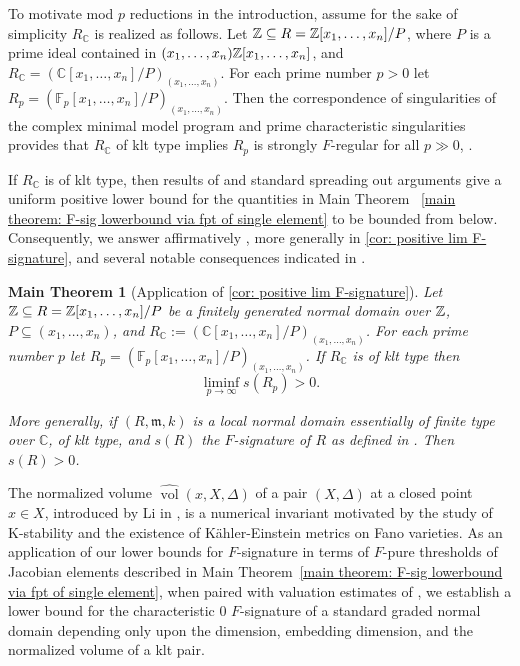 \documentclass[12pt]{amsart}
\numberwithin{equation}{theorem}
\theoremstyle{plain}
\newtheorem{maintheorem}{Main Theorem}
\DeclareMathOperator{\vol}{vol}
\newcommand{\fm}{\mathfrak{m}}
\newcommand{\CC}{\mathbb{C}}
\newcommand{\FF}{\mathbb{F}}
\begin{document}
To motivate mod $p$ reductions in the introduction, assume for the sake of simplicity $R_{\CC}$ is realized as follows. Let $\mbox{$\mathbb{Z}$}\subseteq R = \mbox{$\mathbb{Z}$}[x_1,\ldots,x_n]/P$, where $P$ is a prime ideal contained in $(x_1,\ldots,x_n)\mbox{$\mathbb{Z}$}[x_1,\ldots,x_n]$, and $R_{\CC} = \left(\CC[x_1,\ldots,x_n]/P\right)_{(x_1,\ldots,x_n)}$. For each prime number $p>0$ let $R_p = \left(\FF_p[x_1,\ldots,x_n]/P\right)_{(x_1,\ldots,x_n)}$. Then the correspondence of singularities of the complex minimal model program and prime characteristic singularities provides that $R_{\CC}$ of klt type implies $R_p$ is strongly $F$-regular for all $p\gg 0$, \cite{HaraWatanabe2002, Takagi2004}.

If $R_{\CC}$ is of klt type, then results of \cite{MTW05, CEMS18,TY26,Takagi2004} and standard spreading out arguments give a uniform positive lower bound for the quantities in Main Theorem ~\ref{main theorem: F-sig lowerbound via fpt of single element} to be bounded from below. Consequently, we answer affirmatively \cite[Question~5.9]{CarvajalRojasSchwedeTucker2018}, more generally \cite[Conjecture A]{TY26} in \cref{cor: positive lim F-signature}, and several notable consequences indicated in \cite[Section~5]{CarvajalRojasSchwedeTucker2018}.

\begin{maintheorem}[Application of \cref{cor: positive lim F-signature}]
    \label{main thm: positive F-signature for klt type singularity}
    Let $\mbox{$\mathbb{Z}$}\subseteq R = \mbox{$\mathbb{Z}$}[x_1,\ldots,x_n]/P$ be a finitely generated normal domain over $\mbox{$\mathbb{Z}$}$, $P\subseteq (x_1,\ldots,x_n)$, and $R_{\CC}:= (\CC[x_1,\ldots,x_n]/P)_{(x_1,\ldots,x_n)}$. For each prime number $p$ let $R_p = (\FF_p[x_1,\ldots,x_n]/P)_{(x_1,\ldots,x_n)}$. If $R_{\CC}$ is of klt type then
    \[
    \liminf_{p\to\infty}s(R_p)>0.
    \]

    More generally, if $(R,\fm,k)$ is a local normal domain essentially of finite type over $\CC$, of klt type, and $s(R)$ the $F$-signature of $R$ as defined in \cite[Definition~4.1]{TY26}. Then $s(R)>0$.
\end{maintheorem}

The normalized volume $\widehat{\vol}(x,X,\Delta)$ of a pair $(X,\Delta)$ at a closed point $x\in X$, introduced by Li in \cite{Li18}, is a numerical invariant motivated by the study of K-stability and the existence of K\"ahler-Einstein metrics on Fano varieties. As an application of our lower bounds for $F$-signature in terms of $F$-pure thresholds of Jacobian elements described in Main Theorem~\ref{main theorem: F-sig lowerbound via fpt of single element}, when paired with valuation estimates of \cite{Zhuang24}, we establish a lower bound for the characteristic $0$ $F$-signature of a standard graded normal domain depending only upon the dimension, embedding dimension, and the normalized volume of a klt pair.
\end{document}
